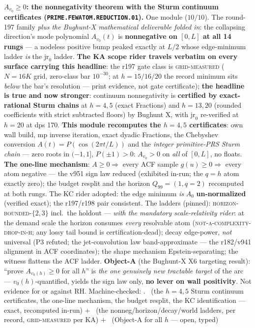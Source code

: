 \documentclass[11pt,a4paper]{article}
\theoremstyle{definition}
\begin{document}
\par\smallskip\noindent\textbf{$A_{v_0} \ge 0$: the nonnegativity
theorem with the Sturm continuum certificates
(\texttt{PRIME.\allowbreak FEWATOM.\allowbreak REDUCTION.01}).}
One module ($10/10$).  The round-197 family \emph{plus the
Bughunt-X mathematical deliverable folded in}: the collapsing
direction's mode polynomial $A_{v_0}(t)$ is \textbf{nonnegative
on $[0, L]$ at all 14 rungs} --- a nodeless positive bump peaked
exactly at $L/2$ whose edge-minimum ladder \emph{is} the
$\mathrm{jr}_0$ ladder.  \textbf{The KA scope rider travels
verbatim on every surface carrying this headline}: the r197 gate
class is \textsc{grid-measured} ($N = 16K$ grid, zero-class bar
$10^{-30}$; at $h = 15/16/20$ the record minimum sits \emph{below}
the bar's resolution --- print evidence, not gate certificate);
\textbf{the headline is true and now stronger}: continuum
nonnegativity is \textbf{certified by exact-rational Sturm
chains} at $h = 4, 5$ (exact Fractions) and $h = 13, 20$ (rounded
coefficients with strict subtracted floors) by Bughunt X, with
$\mathrm{jr}_0$ re-verified at $h = 20$ at dps 170.  \textbf{This
module recomputes the $h = 4, 5$ certificates}: own wall build,
mp inverse iteration, exact dyadic Fractions, the Chebyshev
conversion $A(t) = P(\cos(2\pi t/L))$ and the \emph{integer
primitive-PRS Sturm chain} --- zero roots in $(-1, 1]$,
$P(\pm 1) > 0$: $A_{v_0} > 0$ on \emph{all} of $[0, L]$, no
floats.  \textbf{The one-line mechanism}: $A \ge 0 \Rightarrow$
every ACF sample $g(u) \ge 0 \Rightarrow$ every atom negative ---
the v951 sign law reduced (exhibited in-run; the $q = h$ atom
exactly zero); the budget resplit and the horizon $Q_{99} = (1,
q = 2)$ recomputed at both rungs.  The KC rider adopted: the edge
minimum \emph{is} $A_0$ \textbf{un-normalized} (verified exact);
the r197/r198 pair consistent.  The ladders (pinned):
\textsc{horizon-bounded-$\{2, 3\}$} incl.\ the holdout ---
\emph{with the mandatory scale-relativity rider}: at the demand
scale the horizon consumes \emph{every} resolvable atom
(\textsc{not-a-complexity-drop-in-h}; any lossy tail bound is
certification-dead); decay edge-power, \emph{not} universal (P3
refuted; the jet-convolution law band-approximate --- the
r182/v941 alignment in ACF coordinates); the shape mechanism
Epstein-separating; the witness flattens the ACF ladder.
\textbf{Object-A} (the Bughunt-X X6 targeting result): ``prove
$A_{v_0(h)} \ge 0$ for all $h$'' is \emph{the one genuinely new
tractable target} of the arc --- $v_0(h)$-quantified, yields the
sign law only, \textbf{no lever on wall positivity}.  Not
evidence for or against RH.
Machine-checked: .
\mE\ (the $h = 4, 5$ Sturm continuum certificates, the one-line
mechanism, the budget resplit, the KC identification --- exact,
recomputed in-run) $+$ \mC\ (the nonneg/horizon/decay/world
ladders, per record, \textsc{grid-measured} per KA) $+$ \mO\
(Object-A for all $h$ --- open, typed)
\par\smallskip
\end{document}
